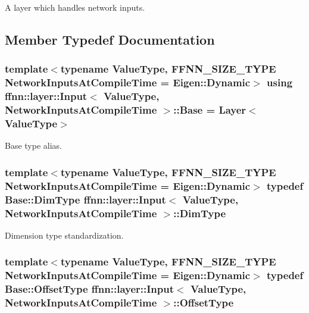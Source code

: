 A layer which handles network inputs. 

\subsection{Member Typedef Documentation}
\hypertarget{classffnn_1_1layer_1_1_input_a7d3eef885863ffbab29a2dba5b9d6e2a}{
\subsubsection[{Base}]{\setlength{\rightskip}{0pt plus 5cm}template$<$typename Value\-Type, F\-F\-N\-N\-\_\-\-S\-I\-Z\-E\-\_\-\-T\-Y\-P\-E Network\-Inputs\-At\-Compile\-Time = Eigen\-::\-Dynamic$>$ using {\bf ffnn\-::layer\-::\-Input}$<$ Value\-Type, Network\-Inputs\-At\-Compile\-Time $>$\-::{\bf Base} =  {\bf Layer}$<$Value\-Type$>$}}\label{classffnn_1_1layer_1_1_input_a7d3eef885863ffbab29a2dba5b9d6e2a}


Base type alias. 

\hypertarget{classffnn_1_1layer_1_1_input_aac96fcbfd3e10e7f5b1d7244e66e4399}{
\subsubsection[{Dim\-Type}]{\setlength{\rightskip}{0pt plus 5cm}template$<$typename Value\-Type, F\-F\-N\-N\-\_\-\-S\-I\-Z\-E\-\_\-\-T\-Y\-P\-E Network\-Inputs\-At\-Compile\-Time = Eigen\-::\-Dynamic$>$ typedef {\bf Base\-::\-Dim\-Type} {\bf ffnn\-::layer\-::\-Input}$<$ Value\-Type, Network\-Inputs\-At\-Compile\-Time $>$\-::{\bf Dim\-Type}}}\label{classffnn_1_1layer_1_1_input_aac96fcbfd3e10e7f5b1d7244e66e4399}


Dimension type standardization. 

\hypertarget{classffnn_1_1layer_1_1_input_af8249b647f4c1d4404ae98741b1686e1}{
\subsubsection[{Offset\-Type}]{\setlength{\rightskip}{0pt plus 5cm}template$<$typename Value\-Type, F\-F\-N\-N\-\_\-\-S\-I\-Z\-E\-\_\-\-T\-Y\-P\-E Network\-Inputs\-At\-Compile\-Time = Eigen\-::\-Dynamic$>$ typedef {\bf Base\-::\-Offset\-Type} {\bf ffnn\-::layer\-::\-Input}$<$ Value\-Type, Network\-Inputs\-At\-Compile\-Time $>$\-::{\bf Offset\-Type}}}\label{classffnn_1_1layer_1_1_input_af8249b647f4c1d4404ae98741b1686e1}


